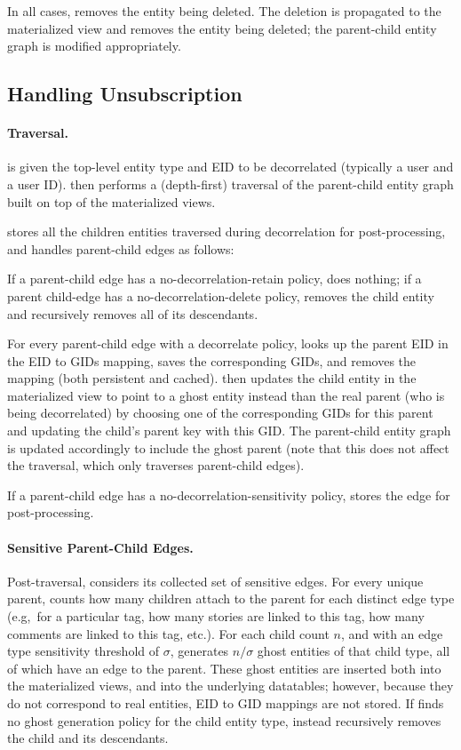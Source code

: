 In all cases, \name removes the entity being deleted.
The deletion is propagated to the materialized view and removes the entity being deleted; the
parent-child entity graph is modified appropriately.

\subsection{Handling Unsubscription}
\paragraph{Traversal.}
\name is given the top-level entity type and EID to be decorrelated (typically a user and a user ID).
\name then performs a (depth-first) traversal of the parent-child entity graph built on top of the materialized
views. 

\name stores all the children entities traversed during decorrelation for post-processing, and
handles parent-child edges as follows:

If a parent-child edge has a no-decorrelation-retain policy, \name does nothing; if a parent child-edge has a
no-decorrelation-delete policy, \name removes the child entity and recursively removes all of its
descendants. 

For every parent-child edge with a decorrelate policy, \name looks up the parent EID in the
EID to GIDs mapping, saves the corresponding GIDs, and removes the mapping (both persistent and
cached).
\name then updates the child entity in the materialized view to point to a ghost entity instead
than the real parent (who is being decorrelated) by choosing one of the corresponding GIDs for this
parent and updating the child's parent key with this GID.  The parent-child entity graph is updated
accordingly to include the ghost parent (note that this does not affect the traversal, which only
traverses parent-child edges).

If a parent-child edge has a no-decorrelation-sensitivity policy, \name stores the edge for
post-processing.

\paragraph{Sensitive Parent-Child Edges.}
Post-traversal, \name considers its collected set of sensitive edges. For every unique parent,
\name counts how many children attach to the parent for each distinct edge type (e.g,\ for a
particular tag, how many stories are linked to this tag, how many comments are linked to this tag,
etc.). For each child count $n$, and with an edge type sensitivity threshold of $\sigma$, 
\name generates $n / \sigma$ ghost entities of that child type, all of which have an edge to the parent.
These ghost entities are inserted both into the materialized views, and into the underlying
datatables; however, because they do not correspond to real entities, EID to GID mappings are not
stored. 
If \name finds no ghost generation policy for the child entity type, \name instead recursively
removes the child and its descendants.

